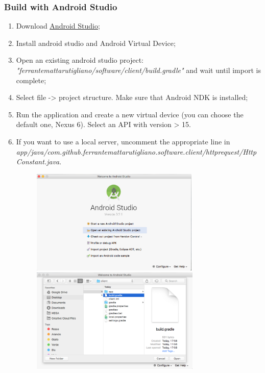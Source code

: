 \documentclass[a4paper]{article}
\begin{document}
\subsubsection{Build with Android Studio}
\begin{enumerate}
    \item Download \href{https://developer.android.com/studio/}{\underline{Android Studio}};
    \item Install android studio and Android Virtual Device;
    \item Open an existing android studio project:
    \newline\textit{"ferrantemattarutigliano/software/client/build.gradle"} and wait until import is complete;
    \item Select file -> project structure. Make sure that Android NDK is installed;
    \item Run the application and create a new virtual device (you can choose the default one, Nexus 6). Select an API with version > 15.
    \item If you want to use a local server, uncomment the appropriate line in \textit{app/java/com.github.ferrantemattarutigliano.software.client/httprequest/HttpConstant.java}.
    \begin{figure}[!htpb]
    \centering
    \includegraphics[height=50mm]{ITD/images/android_studio1.png}
    \includegraphics[height=50mm]{ITD/images/android_studio2.png}
    \end{figure}
\end{enumerate}
\end{document}
